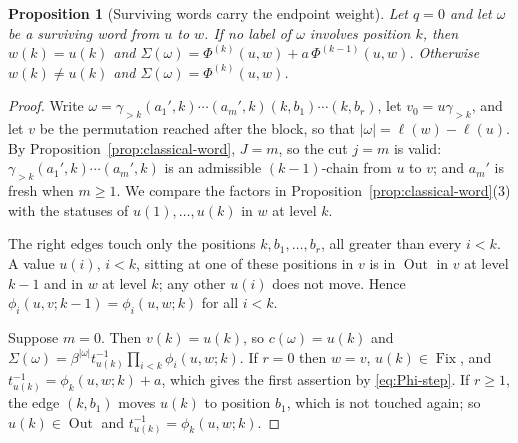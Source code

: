 \documentclass[11pt]{article}
\newtheorem{proposition}{Proposition}
\newcommand{\Fix}{\operatorname{Fix}}
\newcommand{\Out}{\operatorname{Out}}
\newcommand{\ellength}{\ell}
\begin{document}
\begin{proposition}[Surviving words carry the endpoint weight]
\label{prop:survivor-weight}
Let $q=0$ and let $\omega$ be a surviving word from $u$ to $w$. If no
label of $\omega$ involves position $k$, then $w(k)=u(k)$ and
$\Sigma(\omega)=\Phi^{(k)}(u,w)+a\,\Phi^{(k-1)}(u,w)$. Otherwise
$w(k)\neq u(k)$ and $\Sigma(\omega)=\Phi^{(k)}(u,w)$.
\end{proposition}

\begin{proof}
Write $\omega=\gamma_{>k}(a_1',k)\cdots(a_m',k)(k,b_1)\cdots(k,b_r)$,
let $v_0=u\gamma_{>k}$, and let $v$ be the permutation reached after
the block, so that $|\omega|=\ellength(w)-\ellength(u)$. By
Proposition~\ref{prop:classical-word}, $J=m$, so the cut $j=m$ is
valid: $\gamma_{>k}(a_1',k)\cdots(a_m',k)$ is an admissible
$(k-1)$-chain from $u$ to $v$; and $a_m'$ is fresh when $m\geq1$. We
compare the factors in Proposition~\ref{prop:classical-word}(3) with
the statuses of $u(1),\ldots,u(k)$ in $w$ at level $k$.

The right edges touch only the positions $k,b_1,\ldots,b_r$, all
greater than every $i<k$. A value $u(i)$, $i<k$, sitting at one of
these positions in $v$ is in $\Out$ in $v$ at level $k-1$ and in $w$
at level $k$; any other $u(i)$ does not move. Hence
$\phi_i(u,v;k-1)=\phi_i(u,w;k)$ for all $i<k$.

Suppose $m=0$. Then $v(k)=u(k)$, so $c(\omega)=u(k)$ and
$\Sigma(\omega)=\beta^{|\omega|}t_{u(k)}^{-1}\prod_{i<k}\phi_i(u,w;k)$.
If $r=0$ then $w=v$, $u(k)\in\Fix$, and
$t_{u(k)}^{-1}=\phi_k(u,w;k)+a$, which gives the first assertion by
\eqref{eq:Phi-step}. If $r\geq1$, the edge $(k,b_1)$ moves $u(k)$ to
position $b_1$, which is not touched again; so $u(k)\in\Out$ and
$t_{u(k)}^{-1}=\phi_k(u,w;k)$.


\end{proof}
\end{document}
